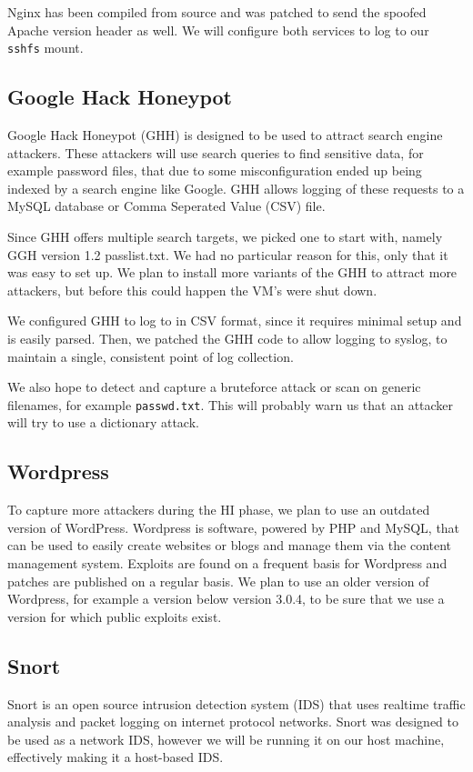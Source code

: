 \documentclass[11pt]{article}
\begin{document}
Nginx has been compiled from source and was patched to send the spoofed Apache version header as well.
We will configure both services to log to our \verb|sshfs| mount.

\subsection{Google Hack Honeypot}
Google Hack Honeypot (GHH) is designed to be used to attract search engine attackers. 
These attackers will use search queries to find sensitive data, for example password files, that due to some misconfiguration ended up being indexed by a search engine like Google.
GHH allows logging of these requests to a MySQL database or Comma Seperated Value (CSV) file.

Since GHH offers multiple search targets, we picked one to start with, namely GGH version 1.2 passlist.txt.
We had no particular reason for this, only that it was easy to set up. 
We plan to install more variants of the GHH to attract more attackers, but before this could happen the VM's were shut down.

We configured GHH to log to in CSV format, since it requires minimal setup and is easily parsed.
Then, we patched the GHH code to allow logging to syslog, to maintain a single, consistent point of log collection.

We also hope to detect and capture a bruteforce attack or scan on generic filenames, for example \verb|passwd.txt|. 
This will probably warn us that an attacker will try to use a dictionary attack.

\subsection{Wordpress}

To capture more attackers during the HI phase, we plan to use an outdated version of WordPress. 
Wordpress is software, powered by PHP and MySQL, that can be used to easily create websites or blogs and manage them via the content management system. 
Exploits are found on a frequent basis for Wordpress and patches are published on a regular basis. 
We plan to use an older version of Wordpress, for example a version below version 3.0.4, to be sure that we use a version for which public exploits exist.

\subsection{Snort}
Snort is an open source intrusion detection system (IDS) that uses realtime traffic analysis and packet logging on internet protocol networks.
Snort was designed to be used as a network IDS, however we will be running it on our host machine, effectively making it a host-based IDS.
\end{document}
